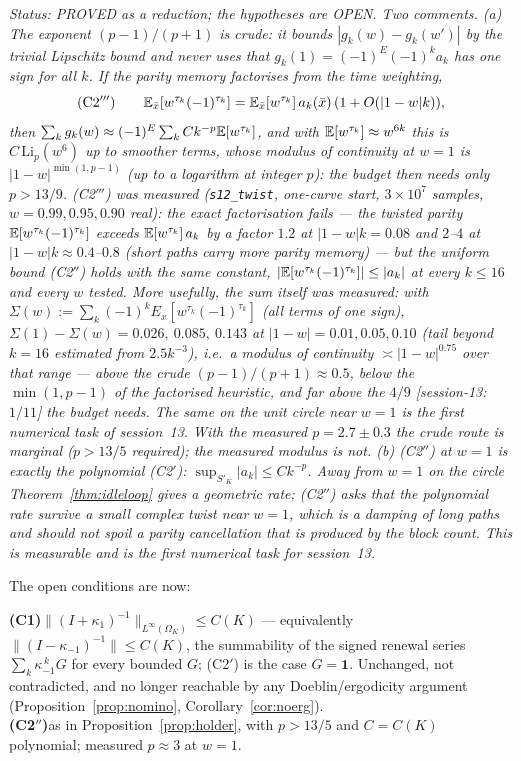 \emph{Status: PROVED as a reduction; the hypotheses are OPEN.  Two
comments.  (a) The exponent $(p-1)/(p+1)$ is crude: it bounds
$|g_k(w)-g_k(w')|$ by the trivial Lipschitz bound and never uses that
$g_k(1)=(-1)^{E}(-1)^ka_k$ has one sign for all $k$.  If the parity
memory factorises from the time weighting,
\[
\text{(C2$'''$)}\qquad
\mathbb{E}_{\bar x}[w^{\tau_k}(-1)^{\tau_k}]=\mathbb{E}_{\bar x}[w^{\tau_k}]\,a_k(\bar x)\,(1+O(|1-w|k)),
\]
then $\sum_kg_k(w)\approx(-1)^E\sum_kCk^{-p}\mathbb{E}[w^{\tau_k}]$, and with
$\mathbb{E}[w^{\tau_k}]\approx w^{6k}$ this is $C\,\mathrm{Li}_p(w^6)$ up to
smoother terms, whose modulus of continuity at $w=1$ is
$|1-w|^{\min(1,p-1)}$ (up to a logarithm at integer $p$): the budget
then needs only $p>13/9$.  (C2$'''$) was measured (\texttt{s12\_twist}, one-curve start,
$3\times10^7$ samples, $w=0.99,0.95,0.90$ real): the exact
factorisation fails --- the twisted parity $\mathbb{E}[w^{\tau_k}(-1)^{\tau_k}]$
exceeds $\mathbb{E}[w^{\tau_k}]\,a_k$ by a factor $1.2$ at $|1-w|k=0.08$ and
$2$--$4$ at $|1-w|k\approx0.4$--$0.8$ (short paths carry more parity
memory) --- but the uniform bound (C2$''$) holds with the same
constant, $|\mathbb{E}[w^{\tau_k}(-1)^{\tau_k}]|\le|a_k|$ at every $k\le16$ and
every $w$ tested.  More usefully, the sum itself was measured: with
$\Sigma(w):=\sum_k(-1)^kE_x[w^{\tau_k}(-1)^{\tau_k}]$ (all terms of one
sign), $\Sigma(1)-\Sigma(w)=0.026,\ 0.085,\ 0.143$ at
$|1-w|=0.01,0.05,0.10$ (tail beyond $k=16$ estimated from $2.5k^{-3}$),
i.e.\ a modulus of continuity $\asymp|1-w|^{0.75}$ over that range ---
above the crude $(p-1)/(p+1)\approx0.5$, below the $\min(1,p-1)$ of the
factorised heuristic, and far above the $4/9$ [session-13: $1/11$] the budget needs.  The
same on the unit circle near $w=1$ is the first numerical task of
session~13.  With the measured $p=2.7\pm0.3$ the crude route is marginal
($p>13/5$ required); the measured modulus is not.  (b) (C2$''$) at $w=1$ is exactly the polynomial
(C2$'$): $\sup_{S'_K}|a_k|\le Ck^{-p}$.  Away from $w=1$ on the circle
Theorem~\ref{thm:idleloop} gives a geometric rate; (C2$''$) asks that
the polynomial rate survive a small complex twist near $w=1$, which is
a damping of long paths and should not spoil a parity cancellation that
is produced by the block count.  This is measurable and is the first
numerical task for session~13.}

\medskip
\noindent The open conditions are now:

\medskip
\noindent\textbf{(C1)}\quad$\|(I+\kappa_1)^{-1}\|_{L^\infty(\Omega_K)}\le C(K)$ ---
equivalently $\|(I-\kappa_{-1})^{-1}\|\le C(K)$, the summability of the
signed renewal series $\sum_k\kappa_{-1}^{\,k}G$ for every bounded $G$;
(C2$'$) is the case $G=\mathbf 1$.  Unchanged, not contradicted, and no
longer reachable by any Doeblin/ergodicity argument
(Proposition~\ref{prop:nomino}, Corollary~\ref{cor:noerg}).\\
\noindent\textbf{(C2$''$)}\quad as in Proposition~\ref{prop:holder},
with $p>13/5$ and $C=C(K)$ polynomial; measured $p\approx3$ at $w=1$.


